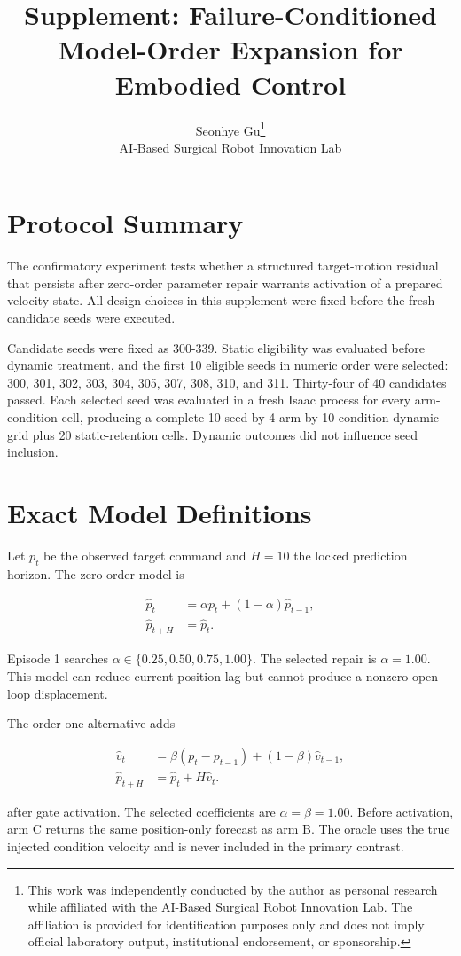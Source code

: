 \documentclass[10pt]{article}
\title{Supplement: Failure-Conditioned Model-Order Expansion for Embodied Control}
\author{Seonhye Gu\thanks{This work was independently conducted by the author as personal research while affiliated with the AI-Based Surgical Robot Innovation Lab. The affiliation is provided for identification purposes only and does not imply official laboratory output, institutional endorsement, or sponsorship.}\\
\small AI-Based Surgical Robot Innovation Lab}
\date{}
\begin{document}
\maketitle


\section{Protocol Summary}

The confirmatory experiment tests whether a structured target-motion residual that persists after zero-order parameter repair warrants activation of a prepared velocity state. All design choices in this supplement were fixed before the fresh candidate seeds were executed.

Candidate seeds were fixed as 300-339. Static eligibility was evaluated before dynamic treatment, and the first 10 eligible seeds in numeric order were selected: 300, 301, 302, 303, 304, 305, 307, 308, 310, and 311. Thirty-four of 40 candidates passed. Each selected seed was evaluated in a fresh Isaac process for every arm-condition cell, producing a complete 10-seed by 4-arm by 10-condition dynamic grid plus 20 static-retention cells. Dynamic outcomes did not influence seed inclusion.

\section{Exact Model Definitions}

Let \(p_t\) be the observed target command and \(H=10\) the locked prediction horizon. The zero-order model is

\begin{align*}
\hat p_t &= \alpha p_t + (1-\alpha)\hat p_{t-1}, \\
\hat p_{t+H} &= \hat p_t.
\end{align*}

Episode 1 searches \(\alpha \in \{0.25,0.50,0.75,1.00\}\). The selected repair is \(\alpha=1.00\). This model can reduce current-position lag but cannot produce a nonzero open-loop displacement.

The order-one alternative adds

\begin{align*}
\hat v_t &= \beta\left(p_t-p_{t-1}\right)
  +(1-\beta)\hat v_{t-1}, \\
\hat p_{t+H} &= \hat p_t + H\hat v_t.
\end{align*}

after gate activation. The selected coefficients are \(\alpha=\beta=1.00\). Before activation, arm C returns the same position-only forecast as arm B. The oracle uses the true injected condition velocity and is never included in the primary contrast.
\end{document}
